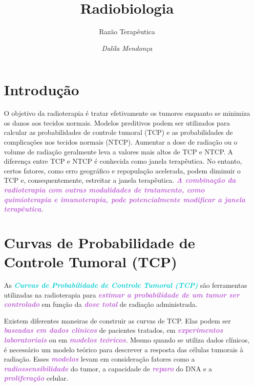 \documentclass[11pt,a4paper]{article}
\title{\LobsterTwo\Huge{Radiobiologia}}
\author{\LobsterTwo\Large{Razão Terapêutica}\nocite{*}}
\date{\LobsterTwo\textit{Dalila Mendonça}}
\begin{document}
	\maketitle

\section{Introdução}

	O objetivo da radioterapia é tratar efetivamente os tumores enquanto se minimiza os danos aos tecidos normais. Modelos preditivos podem ser utilizados para calcular as probabilidades de controle tumoral (TCP) e as probabilidades de complicações nos tecidos normais (NTCP). Aumentar a dose de radiação ou o volume de radiação geralmente leva a valores mais altos de TCP e NTCP. A diferença entre TCP e NTCP é conhecida como janela terapêutica. No entanto, certos fatores, como erro geográfico e repopulação acelerada, podem diminuir o TCP e, consequentemente, estreitar a janela terapêutica. \textcolor{MediumOrchid}{\textbf{\textit{A combinação da radioterapia com outras modalidades de tratamento, como quimioterapia e imunoterapia, pode potencialmente modificar a janela terapêutica}}}.

\section{Curvas de Probabilidade de Controle Tumoral (TCP)}

	As \textcolor{DarkTurquoise}{\textbf{\textit{Curvas de Probabilidade de Controle Tumoral (TCP)}}} são ferramentas utilizadas na radioterapia para \textcolor{MediumOrchid}{\textbf{\textit{estimar a probabilidade de um tumor ser controlado}}} em função da \textcolor{MediumOrchid}{\textbf{\textit{dose total}}} de radiação administrada.

	Existem diferentes maneiras de construir as curvas de TCP. Elas podem ser \textcolor{MediumOrchid}{\textbf{\textit{baseadas em dados clínicos}}} de pacientes tratados, em \textcolor{MediumOrchid}{\textbf{\textit{experimentos laboratoriais}}} ou em \textcolor{MediumOrchid}{\textbf{\textit{modelos teóricos}}}. Mesmo quando se utiliza dados clínicos, é necessário um modelo teórico para descrever a resposta das células tumorais à radiação. Esses \textcolor{MediumOrchid}{\textbf{\textit{modelos}}} levam em consideração fatores como a \textcolor{MediumOrchid}{\textbf{\textit{radiossensibilidade}}} do tumor, a capacidade de \textcolor{MediumOrchid}{\textbf{\textit{reparo}}} do DNA e a \textcolor{MediumOrchid}{\textbf{\textit{proliferação}}} celular.
\end{document}
